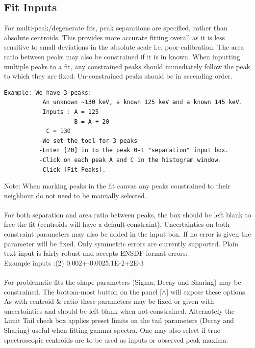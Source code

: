 \documentclass[a4paper,10pt]{article}
\begin{document}
\subsection{Fit Inputs}
For multi-peak/degenerate fits, peak separations are specified, rather than absolute centroids. This provides more accurate fitting overall as it is less sensitive to small deviations in the absolute scale i.e. poor calibration. The area ratio between peaks may also be constrained if it is in known. When inputting multiple peaks to a fit, any constrained peaks should immediately follow the peak to which they are fixed. Un-constrained peaks should be in ascending order.
\begin{lstlisting}
Example: We have 3 peaks:
           An unknown ~130 keV, a known 125 keV and a known 145 keV.
           Inputs : A = 125
                    B = A + 20
		    C = 130
          -We set the tool for 3 peaks
          -Enter [20] in to the peak 0-1 "separation" input box.
          -Click on each peak A and C in the histogram window.
          -Click [Fit Peaks].
\end{lstlisting}
Note: When marking peaks in the fit canvas any peaks constrained to their neighbour do not need to be manually selected.
\\
\\
For both separation and area ratio between peaks, the box should be left blank to free the fit (centroids will have a default constraint). Uncertainties on both constraint parameters may also be added in the input box. If no error is given the parameter will be fixed. Only symmetric errors are currently supported. Plain text input is fairly robust and accepts ENSDF format errors:\\
Example inputs :(2) 0.002+-0.002\qquad5.1E-2+2E-3
\label{sec:errors}
\\
\\
For problematic fits the shape parameters (Sigma, Decay and Sharing) may be constrained. The bottom-most button on the panel [$\wedge$] will expose these options. As with centroid \& ratio these parameters may be fixed or given with uncertainties and should be left blank when not constrained.
Alternately the Limit Tail check box applies preset limits on the tail parameters (Decay and Sharing) useful when fitting gamma spectra.
One may also select if true spectroscopic centroids are to be used as inputs or observed peak maxima.
\end{document}
